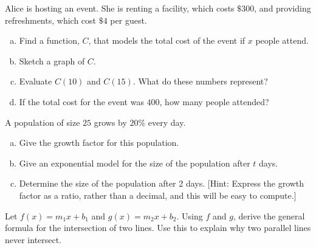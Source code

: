 \documentclass[12pt]{amsart}
\begin{document}
\newpage

\begin{thm}[16 Points]\label{ex7}
  Alice is hosting an event.  She is renting a facility, which costs $\$300$, and providing refreshments, which cost $\$4$ per guest.
  \begin{enumerate}[(a)]
  \item
    Find a function, $C$, that models the total cost of the event if $x$ people attend.
    \vspace{1in}
  \item
    Sketch a graph of $C$.
    \vspace{2in}
  \item
    Evaluate $C(10)$ and $C(15)$.  What do these numbers represent?
    \vspace{1in}
  \item
    If the total cost for the event was $400$, how many people attended?
    \vspace{1in}
  \end{enumerate}
\end{thm}

\newpage

\begin{thm}[16 Points]
  A population of size $25$ grows by $20\%$ every day.
  \begin{enumerate}[(a)]
  \item
    Give the growth factor for this population.
    \vspace{1in}
  \item
    Give an exponential model for the size of the population after $t$ days.
    \vspace{1.5in}
  \item
    Determine the size of the population after 2 days.  [Hint: Express the growth factor as a ratio, rather than a decimal, and this will be easy to compute.]
    \vspace{1.5in}
  \end{enumerate}
\end{thm}

\begin{thm}\label{bonus}
  Let $f(x) = m_1x + b_1$ and $g(x) = m_2x + b_2$.
  Using $f$ and $g$, derive the general formula for the intersection of two lines.
  Use this to explain why two parallel lines never intersect.
\end{thm}
\end{document}
